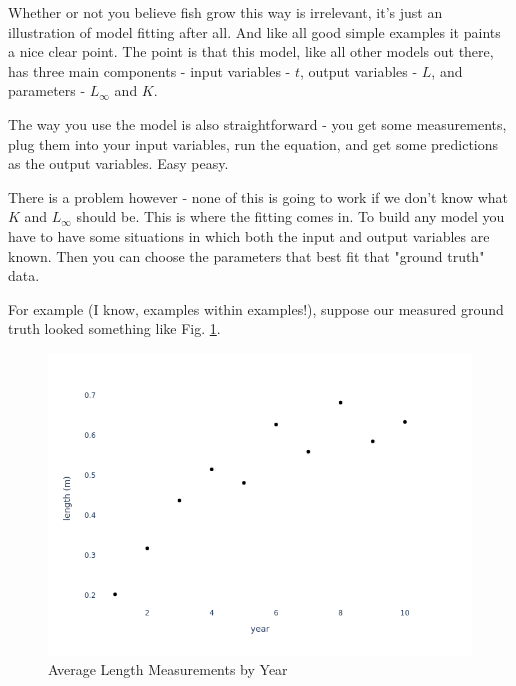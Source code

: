 \documentclass[11pt,a5paper]{book}
\begin{document}
Whether or not you believe fish grow this way is irrelevant, it's just an illustration of model fitting after all. And like all good simple examples it paints a nice clear point. The point is that this model, like all other models out there, has three main components - input variables - $t$, output variables - $L$, and parameters - $L_{\infty}$ and $K$. 
\newline

The way you use the model is also straightforward - you get some measurements, plug them into your input variables, run the equation, and get some predictions as the output variables. Easy peasy. 
\newline

There is a problem however - none of this is going to work if we don't know what $K$ and $L_{\infty}$ should be. This is where the fitting comes in. To build any model you have to have some situations in which both the input and output variables are known. Then you can choose the parameters that best fit that "ground truth" data. 
\newline

For example (I know, examples within examples!), suppose our measured ground truth looked something like Fig. \ref{fig:length_measurements_by_year}.
\newline


\begin{figure}[h!] 
  \includegraphics[scale=0.35]{notebooks/Fitting/new_measurements.png}
  \caption{Average Length Measurements by Year}
  \label{fig:length_measurements_by_year}
\end{figure}
\end{document}

